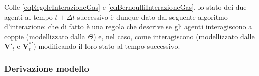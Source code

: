         Colle \ref{eqRegoleInterazioneGas} e \ref{eqBernoulliInterazioneGas}, lo stato dei due agenti al tempo \(t+\Delta t\) successivo è dunque dato dal seguente algoritmo d'interazione:
        che di fatto è una regola che descrive se gli agenti interagiscono a coppie (modellizzato dalla \(\Theta\)) e, nel caso, come interagiscono (modellizzato dalle \(\mathbf V'_t\) e \(\mathbf V^{*\prime}_t\)) modificando il loro stato al tempo successivo.

      \subsubsection{Derivazione modello}

